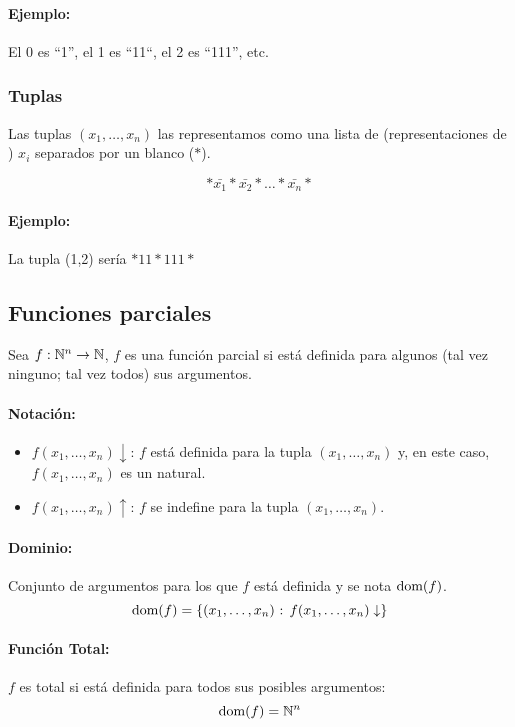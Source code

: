 	\paragraph{Ejemplo:} El 0 es ``1'', el 1 es ``11``, el 2 es ``111'', etc.
	
	\subsubsection{Tuplas}
	Las tuplas $(x_1,\dots,x_n)$ las representamos como una lista de (representaciones de ) $x_i$ separados por un blanco ($*$).
	
	$$*\bar{x_1}*\bar{x_2}*\dots*\bar{x_n}*$$
	
	\paragraph{Ejemplo:} La tupla (1,2) sería $*11*111*$
	\subsection{Funciones parciales}
	Sea $f:\mathbb{N}^n\to\mathbb{N}$, $f$ es una función parcial si está definida para algunos (tal vez ninguno; tal vez todos) sus argumentos. 
	
	\paragraph{Notación:}
	\begin{itemize}
		\item $f(x_1,\dots,x_n)\downarrow$: $f$ está definida para la tupla $(x_1,\dots,x_n)$ y, en este caso, $f(x_1,\dots,x_n)$ es un natural.
		\item $f(x_1,\dots,x_n)\uparrow$: $f$ se indefine para la tupla $(x_1,\dots,x_n)$.
	\end{itemize}

	\paragraph{Dominio:} Conjunto de argumentos para los que $f$ está definida y se nota $\text{dom}(f)$.
	$$\text{dom}(f) = \{(x_1,\dots,x_n) \text{ : } f(x_1,\dots,x_n)\downarrow\}$$ 
	
	\paragraph{Función Total:} $f$ es total si está definida para todos sus posibles argumentos:
	$$\text{dom}(f) = \mathbb{N}^n$$
	
